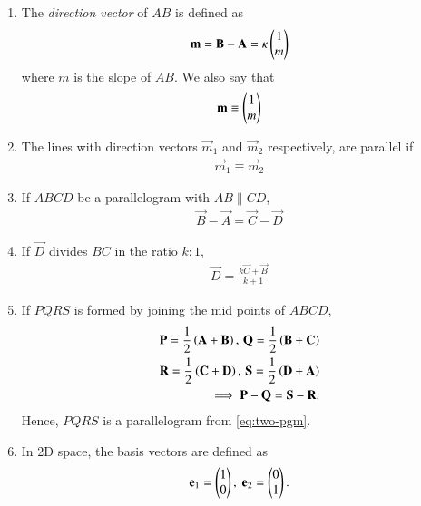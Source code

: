 \begin{enumerate}[label=\thesubsection.\arabic*.,ref=\thesubsection.\theenumi]
	\item The {\em direction vector} of $AB$ is defined as
		\begin{align}
		\label{eq:dir-vec}
			\mathbf{m}=\mathbf{B}-
			\mathbf{A} = \kappa
			\begin{pmatrix}1 \\ m\end{pmatrix}
		\end{align}
		where $m$ is the slope of $AB$.  We also say that 
\begin{align}
\mathbf{m}\equiv   \begin{pmatrix}1 \\ m\end{pmatrix}
\end{align}
	\item The lines with direction vectors $\vec{m}_1$ and $\vec{m}_2$
		respectively, are parallel if 
\begin{align}
\vec{m}_1\equiv   \vec{m}_2
\end{align}
  \item If $ABCD$ be a parallelogram with $AB \parallel CD$,
	  \label{prop:two-pgm}
  \begin{align}
	  \label{eq:two-pgm}
 \vec{B}-\vec{A} = \vec{C} -\vec{D}
  \end{align}
\item If $\vec{D}$ divides $BC$ in the ratio $k : 1$,
		\begin{align}
			\vec{D}= \frac{k\vec{C}+\vec{B}}{k+1}
	  \label{eq:section_formula}
		\end{align}
  \item 
If $PQRS$ is formed by joining the mid points of $ABCD$, 
\begin{align}
  \mathbf{P} = \frac{1}{2}\left(\mathbf{A}+\mathbf{B}\right) 
  ,\,
 \mathbf{Q} = \frac{1}{2}\left(\mathbf{B}+\mathbf{C}\right) 
 \\
 \mathbf{R} = \frac{1}{2}\left(\mathbf{C}+\mathbf{D}\right)   
  ,\,
 \mathbf{S} = \frac{1}{2}\left(\mathbf{D}+\mathbf{A}\right)  
 \\
	\implies 
 \mathbf{P}-\mathbf{Q} = \mathbf{S} -\mathbf{R}.
  \label{eq:10/7/4/8det2f}
\end{align}
Hence, $PQRS$ is a parallelogram
	  from \eqref{eq:two-pgm}.
	\item In 2D space,  the basis vectors are defined as 
\begin{align}
	\mathbf{e}_1 = \begin{pmatrix}1 \\ 0\end{pmatrix},\
	\mathbf{e}_2 = \begin{pmatrix}0 \\ 1\end{pmatrix}.
\end{align}

\end{enumerate}
